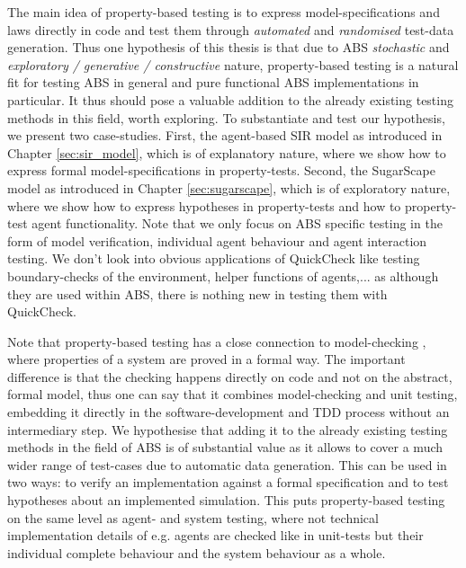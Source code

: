 The main idea of property-based testing is to express model-specifications and laws directly in code and test them through \textit{automated} and \textit{randomised} test-data generation. Thus one hypothesis of this thesis is that due to ABS \textit{stochastic} and \textit{exploratory / generative / constructive } nature, property-based testing is a natural fit for testing ABS in general and pure functional ABS implementations in particular. It thus should pose a valuable addition to the already existing testing methods in this field, worth exploring. To substantiate and test our hypothesis, we present two case-studies. First, the agent-based SIR model as introduced in Chapter \ref{sec:sir_model}, which is of explanatory nature, where we show how to express formal model-specifications in property-tests. Second, the SugarScape model as introduced in Chapter \ref{sec:sugarscape}, which is of exploratory nature, where we show how to express hypotheses in property-tests and how to property-test agent functionality. Note that we only focus on ABS specific testing in the form of model verification, individual agent behaviour and agent interaction testing. We don't look into obvious applications of QuickCheck like testing boundary-checks of the environment, helper functions of agents,... as although they are used within ABS, there is nothing new in testing them with QuickCheck.

\medskip

Note that property-based testing has a close connection to model-checking \cite{mcmillan_symbolic_1993}, where properties of a system are proved in a formal way. The important difference is that the checking happens directly on code and not on the abstract, formal model, thus one can say that it combines model-checking and unit testing, embedding it directly in the software-development and TDD process without an intermediary step. We hypothesise that adding it to the already existing testing methods in the field of ABS is of substantial value as it allows to cover a much wider range of test-cases due to automatic data generation. This can be used in two ways: to verify an implementation against a formal specification and to test hypotheses about an implemented simulation. This puts property-based testing on the same level as agent- and system testing, where not technical implementation details of e.g. agents are checked like in unit-tests but their individual complete behaviour and the system behaviour as a whole.

